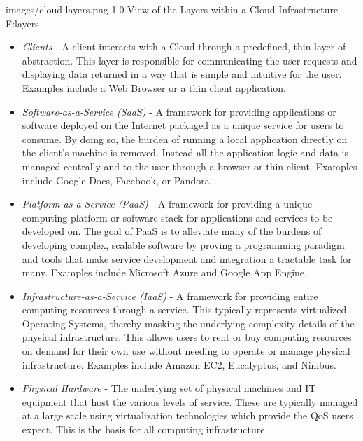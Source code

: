  {images/cloud-layers.png}
 {1.0}
 {View of the Layers within a Cloud Infrastructure}
 {F:layers}


\begin{itemize}
\item{\em Clients} - A client interacts with a Cloud through a predefined, thin layer of abstraction.  This layer is responsible for communicating the user requests and displaying data returned in a way that is simple and intuitive for the user. Examples include a Web Browser or a thin client application.

\item{\em Software-as-a-Service (SaaS)} - A framework for providing applications or software deployed on the Internet packaged as a unique service for users to consume.  By doing so, the burden of running a local application directly on the client's machine is removed.  Instead all the application logic and data is managed centrally and to the user through a browser or thin client.  Examples include Google Docs, Facebook, or Pandora.

\item{\em Platform-as-a-Service (PaaS)} - A framework for providing a unique computing platform or software stack for applications and services to be developed on.  The goal of PaaS is to alleviate many of the burdens of developing complex, scalable software by proving a programming paradigm and tools that make service development and integration a tractable task for many.  Examples include Microsoft Azure and Google App Engine.

\item{\em Infrastructure-as-a-Service (IaaS)} - A framework for providing entire computing resources through a service.  This typically represents virtualized Operating Systems, thereby masking the underlying complexity details of the physical infrastructure.  This allows users to rent or buy computing resources on demand for their own use without needing to operate or manage physical infrastructure.  Examples include Amazon EC2, Eucalyptus, and Nimbus.

\item{\em Physical Hardware} - The underlying set of physical machines and IT equipment that host the various levels of service.  These are typically managed at a large scale using virtualization technologies which provide the QoS users expect.  This is the basis for all computing infrastructure.
\end{itemize}

